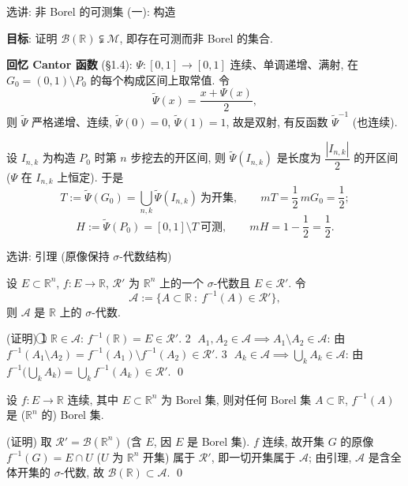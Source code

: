 
\begin{frame}{选讲: 非 Borel 的可测集 (一): 构造}

\textbf{目标}: 证明 $\mathscr{B}(\mathbb{R}) \subsetneqq \mathscr{M}$, 即存在可测而非 Borel 的集合.

\pause

\textbf{回忆 Cantor 函数} (§1.4): $\Psi: [0,1] \to [0,1]$ 连续、单调递增、满射, 在 $G_0 = (0,1) \setminus P_0$ 的每个构成区间上取常值. 令
\[
\widetilde{\Psi}(x) = \frac{x + \Psi(x)}{2},
\]
则 $\widetilde{\Psi}$ 严格递增、连续, $\widetilde{\Psi}(0) = 0$, $\widetilde{\Psi}(1) = 1$, 故是\alert{双射}, 有反函数 $\widetilde{\Psi}^{-1}$ (也连续).

\pause

设 $I_{n,k}$ 为构造 $P_0$ 时第 $n$ 步挖去的开区间, 则 $\widetilde{\Psi}(I_{n,k})$ 是长度为 $\dfrac{|I_{n,k}|}{2}$ 的开区间 ($\Psi$ 在 $I_{n,k}$ 上恒定). 于是
\[
T := \widetilde{\Psi}(G_0) = \bigcup_{n, k} \widetilde{\Psi}(I_{n,k}) \ \text{为开集}, \qquad
mT = \frac{1}{2}\, mG_0 = \frac{1}{2};
\]
\[
H := \widetilde{\Psi}(P_0) = [0,1] \setminus T \ \text{可测}, \qquad mH = 1 - \frac{1}{2} = \frac{1}{2}.
\]

\end{frame}


\begin{frame}{选讲: 引理 (原像保持 $\sigma$-代数结构)}

\begin{lem}
设 $E \subset \mathbb{R}^n$, $f: E \to \mathbb{R}$, $\mathscr{R}'$ 为 $\mathbb{R}^n$ 上的一个 $\sigma$-代数且 $E \in \mathscr{R}'$. 令
\[
\mathscr{A} := \{A \subset \mathbb{R}\ :\ f^{-1}(A) \in \mathscr{R}'\},
\]
则 $\mathscr{A}$ 是 $\mathbb{R}$ 上的 $\sigma$-代数.
\end{lem}

\startproof[bg=yellow, fg=red](证明)
\textcircled{1} $\mathbb{R} \in \mathscr{A}$: $f^{-1}(\mathbb{R}) = E \in \mathscr{R}'$.
\textcircled{2} $A_1, A_2 \in \mathscr{A} \implies A_1 \setminus A_2 \in \mathscr{A}$: 由
$f^{-1}(A_1 \setminus A_2) = f^{-1}(A_1) \setminus f^{-1}(A_2) \in \mathscr{R}'$.
\textcircled{3} $A_k \in \mathscr{A} \implies \bigcup_k A_k \in \mathscr{A}$: 由
$f^{-1}\big(\bigcup_k A_k\big) = \bigcup_k f^{-1}(A_k) \in \mathscr{R}'$.
\qed

\pause

\begin{cor}
设 $f: E \to \mathbb{R}$ 连续, 其中 $E \subset \mathbb{R}^n$ 为 Borel 集, 则对任何 Borel 集 $A \subset \mathbb{R}$, $f^{-1}(A)$ 是 ($\mathbb{R}^n$ 的) Borel 集.
\end{cor}

\startproof[bg=yellow, fg=red](证明)
取 $\mathscr{R}' = \mathscr{B}(\mathbb{R}^n)$ (含 $E$, 因 $E$ 是 Borel 集). $f$ 连续, 故开集 $G$ 的原像 $f^{-1}(G) = E \cap U$ ($U$ 为 $\mathbb{R}^n$ 开集) 属于 $\mathscr{R}'$, 即一切开集属于 $\mathscr{A}$; 由引理, $\mathscr{A}$ 是含全体开集的 $\sigma$-代数, 故 $\mathscr{B}(\mathbb{R}) \subset \mathscr{A}$.
\qed

\end{frame}

